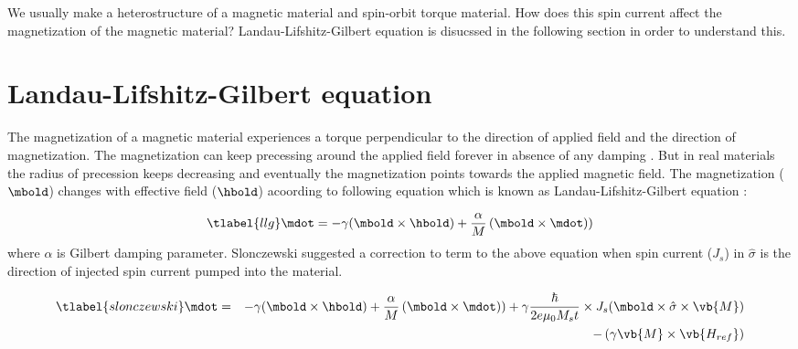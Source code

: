 We usually make a heterostructure of a magnetic material and spin-orbit torque material. 
How does this spin current affect the magnetization of the magnetic material? Landau-Lifshitz-Gilbert 
equation is disucssed in the following section in order to understand this.



\section{Landau-Lifshitz-Gilbert equation}
The magnetization of a magnetic material experiences a torque perpendicular to the direction of 
applied field and the direction of magnetization. The magnetization can keep precessing around 
the applied field forever in absence of any damping . But in real materials the radius of 
precession keeps decreasing and eventually the magnetization points towards the applied 
magnetic field.  The magnetization ($\mbold$) changes with effective field ($\hbold$) acoording
to following equation which is known as Landau-Lifshitz-Gilbert equation \cite{Hickey2009}:

\begin{equation}
    \tlabel{llg}
    \mdot = -\gamma(\mbold \times \hbold)+ \frac{\alpha}{M} \left(\mbold \times \mdot)\right)
\end{equation}
where $\alpha$ is Gilbert damping parameter. 
Slonczewski suggested a correction to term to the above equation when spin current (${J_{s}}$) in 
$\hat{\sigma}$ is the direction of injected spin current pumped into the material. 

\begin{eqnarray} \nonumber
    \tlabel{slonczewski}
    \mdot &=& -\gamma(\mbold \times \hbold) + \frac{\alpha}{M} \left(\mbold \times \mdot)\right) +
             \gamma \frac{\hbar}{2e \mu_{0} M_{s} t} \times J_{s} (\mbold \times \hat{\sigma} \times \vb{M})\\
            && - \left( \gamma \vb{M} \times \vb{H_{ref}} \right)
\end{eqnarray}

